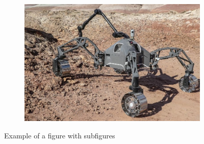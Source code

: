 \begin{figure}
\begin{subfigure}[t]{\subfigureWidth}
		\label{fig:SherpaTT_RPA_Crater}
	\end{subfigure}\hfill
    \begin{subfigure}[t]{\subfigureWidth}
        \centering
		\includegraphics[height=\graphicsHeight]{pictures/SherpaTT_SamplingUtah}
		\label{fig:SherpaTT_SamplingUtah}
	\end{subfigure}
	\caption{Example of a figure with subfigures}
	\label{fig:SherpaTT}
\vspace{-2ex}
\end{figure}


